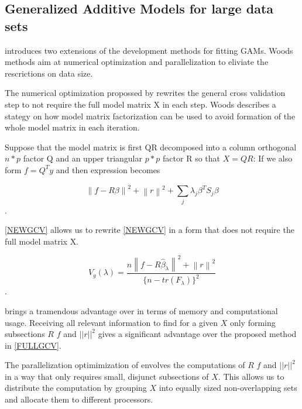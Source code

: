 \documentclass{article}
\begin{document}
    \subsection{Generalized Additive Models for large data sets}
    \cite{bigdataGAM} introduces two extensions of the development methods for fitting GAMs. Woods methods aim at numerical optimization and parallelization to eliviate the rescrictions on data size.

    The numerical optimization propossed by \cite{bigdataGAM} rewrites the general cross validation step to not require the full model matrix X in each step. Woods describes a stategy on how model matrix factorization can be used to avoid formation of the whole model matrix in each iteration.

    Suppose that the model matrix is first QR decomposed into a column orthogonal $n * p$ factor Q and an upper triangular $p * p$ factor R so that $X=QR$: If we also form $f =Q^Ty$ and then expression \label{finalsmooth} becomes

    \begin{equation} \label{NEWGCV} \left \| f- R\beta \right \|^2 + \left \| r \right \|^2 + \sum_{j}^{ } \lambda_j \beta^T S_j \beta \end{equation}.

    \ref{NEWGCV} allows us to rewrite \ref{NEWGCV} in a form that does not require the full model matrix X.

    \begin{equation} \label{NEWNEWGCV} V_g(\lambda) = \frac{n\left \| f-R\widehat{\beta}_\lambda \right \| ^2 + \left  \| r \right \| ^2}{\{n-tr(F_\lambda) \}^2} \end{equation}.

    \label{NEWNEWGCV} brings a tramendous advantage over \label{FULLGCV} in terms of memory and computational usage. Receiving all relevant information to find \textlambda for a given $X$ only forming subsections $R$ $f$ and $||r||^2$ gives a significant advantage over the proposed method in \ref{FULLGCV}.

    The parallelization optimimization of \label{FULLGCV} envolves the computations of $R$ $f$ and $||r||^2$ in a way that only requires small, disjunct subsections of $X$. This allows us to distribute the computation by grouping $X$ into equally sized non-overlapping sets and allocate them to different processors.
\end{document}
